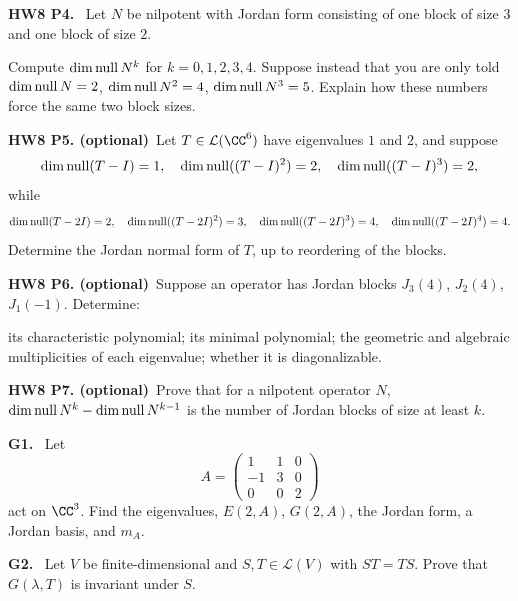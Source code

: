 \documentclass[10pt]{scrartcl}
\newcommand{\LL}{\mathcal L}\newcommand{\PP}{\mathcal P}\newcommand{\MM}{\mathcal M}
\begin{document}
\begin{prob}
\textbf{HW8 P4. }\ Let $N$ be nilpotent with Jordan form consisting of one block of size $3$ and one block of size $2$.
\begin{enumerate}[(a)]
  \ii Compute $\dim\operatorname{null} N^k$ for $k=0,1,2,3,4$.
  \ii Suppose instead that you are only told $\dim\operatorname{null} N=2$, $\dim\operatorname{null} N^2=4$, $\dim\operatorname{null} N^3=5$. Explain how these numbers force the same two block sizes.
\end{enumerate}
\end{prob}

\begin{prob}
\textbf{HW8 P5. (optional)}\ Let $T\in\LL(\CC^6)$ have eigenvalues $1$ and $2$, and suppose
\[ \dim\operatorname{null}(T-I)=1,\quad\dim\operatorname{null}((T-I)^2)=2,\quad\dim\operatorname{null}((T-I)^3)=2, \]
while
\[ \dim\operatorname{null}(T-2I)=2,\quad\dim\operatorname{null}((T-2I)^2)=3,\quad\dim\operatorname{null}((T-2I)^3)=4,\quad\dim\operatorname{null}((T-2I)^4)=4. \]
Determine the Jordan normal form of $T$, up to reordering of the blocks.
\end{prob}

\begin{prob}
\textbf{HW8 P6. (optional)}\ Suppose an operator has Jordan blocks $J_3(4)$, $J_2(4)$, $J_1(-1)$. Determine:
\begin{enumerate}[(a)]
  \ii its characteristic polynomial;
  \ii its minimal polynomial;
  \ii the geometric and algebraic multiplicities of each eigenvalue;
  \ii whether it is diagonalizable.
\end{enumerate}
\end{prob}

\begin{prob}
\textbf{HW8 P7. (optional)}\ Prove that for a nilpotent operator $N$, $\dim\operatorname{null} N^k-\dim\operatorname{null} N^{k-1}$ is the number of Jordan blocks of size at least $k$.
\end{prob}

\begin{prob}
\textbf{G1. }\ Let
\[
  A=\begin{pmatrix}1&1&0\\-1&3&0\\0&0&2\end{pmatrix}
\]
act on $\CC^3$. Find the eigenvalues, $E(2,A)$, $G(2,A)$, the Jordan form, a Jordan basis, and $m_A$.
\end{prob}

\begin{prob}
\textbf{G2. }\ Let $V$ be finite-dimensional and $S,T\in\LL(V)$ with $ST=TS$. Prove that $G(\lambda,T)$ is invariant under $S$.
\end{prob}
\end{document}
